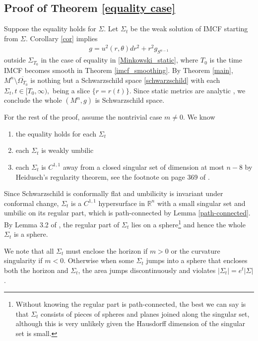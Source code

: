 \documentclass[12pt,twoside]{article}
\theoremstyle{plain}
\theoremstyle{definition}
\theoremstyle{remark}
\newcommand{\R}{\mathbb{R}}
\numberwithin{equation}{section}
\begin{document}
\subsection{Proof of Theorem \ref{equality case}}
Suppose the equality holds for $\Sigma$. Let $\Sigma_t$ be the weak solution of IMCF starting from $\Sigma$. Corollary \ref{cor} implies
\begin{align*}
g = u^2 (r,\theta) dr^2 + r^2 g_{S^{n-1}}
\end{align*}
outside $\Sigma_{T_{0}}$ in the case of equality in \eqref{Minkowski_static}, where $T_0$ is the time IMCF becomes smooth in Theorem \ref{imcf_smoothing}. By Theorem \ref{main}, $M^{n} \setminus \overline{\Omega_{T_{0}}}$ is nothing but a Schwarzschild space \eqref{schwarzschild} with each $\Sigma_{t}, t \in [T_0,\infty),$ being a slice $\{ r=r(t)\}$. Since static metrics are analytic \cite{static_analytic}, we conclude the whole $(M^{n},g)$ is Schwarzschild space. 

For the rest of the proof, assume the nontrivial case $m \neq 0$. We know
\begin{enumerate}
\item the equality holds for each $\Sigma_t$
\item each $\Sigma_t$ is weakly umbilic
\item each $\Sigma_t$ is $C^{1,1}$ away from a closed singular set of dimension at most $n-8$ by Heidusch's regularity theorem, see the footnote on page 369 of \cite{HI}.
\end{enumerate}

Since Schwarzschild is conformally flat and umbilicity is invariant under conformal change, $\Sigma_t$ is a $C^{1,1}$ hypersurface in $\R^n$ with a small singular set and umbilic on its regular part, which is path-connected by Lemma \ref{path-connected}. By Lemma 3.2 of \cite{DRKS20}, the regular part of $\Sigma_t$ lies on a sphere\footnote{Without knowing the regular part is path-connected, the best we can say is that $\Sigma_t$ consists of pieces of spheres and planes joined along the singular set, although this is very unlikely given the Hausdorff dimension of the singular set is small.} and hence the whole $\Sigma_t$ is a sphere.

We note that all $\Sigma_t$ must enclose the horizon if $m > 0$ or the curvature singularity if $m<0$. Otherwise when some $\Sigma_t$ jumps into a sphere that encloses both the horizon and $\Sigma_t$, the area jumps discontinuously and violates $|\Sigma_t| = e^t |\Sigma|$.
\end{document}
